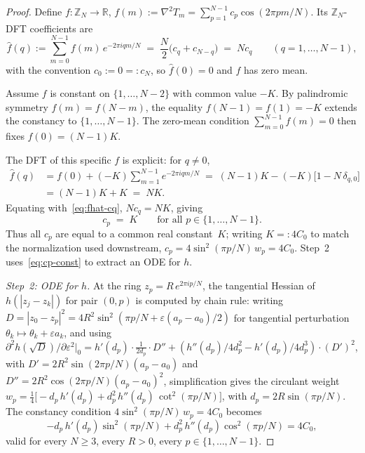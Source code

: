 \begin{proof}
Define $f: \mathbb{Z}_N \to \mathbb{R}$,
$f(m) := \nabla^2 T_m = \sum_{p=1}^{N-1} c_p \cos(2\pi pm/N)$.
Its $\mathbb{Z}_N$-DFT coefficients are
\begin{equation}\label{eq:fhat-cq}
  \widehat f(q)
  := \sum_{m=0}^{N-1} f(m)\,e^{-2\pi iqm/N}
  \;=\; \frac{N}{2}\bigl(c_q + c_{N-q}\bigr)
  \;=\; N c_q
  \qquad (q = 1, \ldots, N{-}1),
\end{equation}
with the convention $c_0 := 0 =: c_N$, so
$\widehat f(0) = 0$ and $f$ has zero mean.

Assume $f$ is constant on $\{1, \ldots, N{-}2\}$ with common
value $-K$.  By palindromic symmetry $f(m) = f(N{-}m)$,
the equality $f(N{-}1) = f(1) = -K$ extends the constancy
to $\{1, \ldots, N{-}1\}$.  The zero-mean condition
$\sum_{m=0}^{N-1} f(m) = 0$ then fixes
$f(0) = (N{-}1) K$.

The DFT of this specific $f$ is explicit: for $q \ne 0$,
\begin{align*}
  \widehat f(q)
  &= f(0) + (-K) \sum_{m=1}^{N-1} e^{-2\pi iqm/N}
  \;=\; (N{-}1) K - (-K)\bigl[1 - N\,\delta_{q,0}\bigr]
  \\
  &= (N{-}1) K + K \;=\; N K.
\end{align*}
Equating with~\eqref{eq:fhat-cq}, $N c_q = N K$, giving
\begin{equation}\label{eq:cp-const}
  c_p \;=\; K
  \qquad\text{for all } p \in \{1, \ldots, N{-}1\}.
\end{equation}
Thus all $c_p$ are equal to a common real constant~$K$;
writing $K =: 4 C_0$ to match the normalization used
downstream,
$c_p = 4 \sin^2(\pi p/N)\, w_p = 4 C_0$.
Step~2 uses~\eqref{eq:cp-const} to extract an ODE for $h$.

\emph{Step~2: ODE for $h$.}
At the ring $z_p = R\,e^{2\pi i p/N}$, the tangential
Hessian of $h(|z_j{-}z_k|)$ for pair $(0, p)$ is computed
by chain rule: writing $D = |z_0{-}z_p|^2
= 4R^2\sin^2(\pi p/N + \varepsilon(a_p{-}a_0)/2)$
for tangential perturbation $\theta_k \mapsto \theta_k
+ \varepsilon a_k$, and using
$\partial^2 h(\sqrt{D})/\partial\varepsilon^2\big|_0
= h'(d_p)\cdot \tfrac{1}{2d_p}\cdot D''
+ (h''(d_p)/4d_p^2 - h'(d_p)/4d_p^3)\cdot (D')^2$,
with $D' = 2R^2\sin(2\pi p/N)(a_p{-}a_0)$ and
$D'' = 2R^2\cos(2\pi p/N)(a_p{-}a_0)^2$,
simplification gives the circulant weight
$w_p = \tfrac{1}{4}\bigl[
  -d_p\,h'(d_p) + d_p^2\,h''(d_p)\,
  \cot^2(\pi p/N)\bigr]$,
with $d_p = 2R\sin(\pi p/N)$.
The constancy condition
$4\sin^2(\pi p/N)\,w_p = 4C_0$ becomes
\begin{equation}\label{eq:uniq-ode}
  -d_p\,h'(d_p)\sin^2(\pi p/N)
  + d_p^2\,h''(d_p)\cos^2(\pi p/N)
  = 4C_0,
\end{equation}
valid for every $N \ge 3$, every $R > 0$, every
$p \in \{1, \ldots, N{-}1\}$.


\end{proof}
